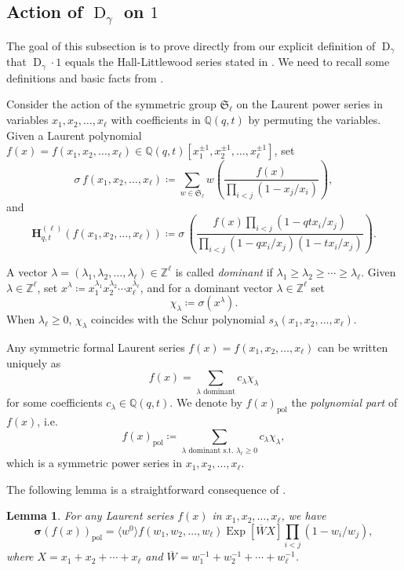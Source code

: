 \documentclass[reqno]{amsart}
\theoremstyle{plain}
\newtheorem{lemma}[theorem]{Lemma}
\theoremstyle{definition}
\theoremstyle{remark}
\DeclareMathOperator{\D}{D}
\DeclareMathOperator{\Exp}{Exp}
\newcommand{\<}{\langle}
\renewcommand{\>}{\rangle}
\begin{document}
\subsection{Action of \texorpdfstring{$\D_\gamma$}{Dgamma} on \texorpdfstring{$1$}{1}}
\label{section:Dgammaon1}

The goal of this subsection is to prove directly from our explicit definition of $\D_\gamma$ that $\D_\gamma \cdot 1$ equals the Hall-Littlewood series stated in \cite[Corollary~3.7.2]{BHMPS2023ShuffleAnyLine}. We need to recall some definitions and basic facts from \cite[Section~2]{BHMPS2023ShuffleAnyLine}.

Consider the action of the symmetric group $\mathfrak{S}_\ell$ on the Laurent power series in variables $x_1,x_2,\dots,x_\ell$ with coefficients in $\mathbb{Q}(q,t)$ by permuting the variables. Given a Laurent polynomial $f(x) = f(x_1,x_2,\dots,x_\ell) \in \mathbb{Q}(q,t)[x_1^{\pm 1}, x_2^{\pm 1}, \dots, x_\ell^{\pm 1}]$, set
\[
    \textbf{$\sigma$}\, f(x_1,x_2,\dots,x_\ell) \coloneqq \sum_{w\in \mathfrak{S}_\ell}w\left(\frac{f(x)}{\prod_{i<j}(1-x_j/x_i)}\right),
\]
and
\[
    \mathbf{H}_{q,t}^{(\ell)}(f(x_1,x_2,\dots,x_\ell)) \coloneqq \textbf{$\sigma$}\, \left( \frac{f(x) \prod_{i<j}(1-qtx_i/x_j) }{\prod_{i<j}(1-qx_i/x_j)(1-tx_i/x_j)}\right).
\]

A vector $\lambda=(\lambda_1,\lambda_2,\dots,\lambda_\ell) \in \mathbb{Z}^\ell$ is called \emph{dominant} if $\lambda_1\geq \lambda_2\geq\cdots \geq \lambda_\ell$. Given $\lambda\in \mathbb{Z}^\ell$, set $x^\lambda \coloneqq x_1^{\lambda_1}x_2^{\lambda_2}\cdots x_\ell^{\lambda_\ell}$, and for a dominant vector $\lambda\in \mathbb{Z}^\ell$ set
\[\chi_\lambda \coloneqq \textbf{$\sigma$}(x^\lambda).\]
When $\lambda_\ell\geq 0$, $\chi_\lambda$ coincides with the Schur polynomial $s_\lambda(x_1,x_2,\dots,x_\ell)$.

Any symmetric formal Laurent series $f(x) = f(x_1,x_2,\dots,x_\ell)$ can be written uniquely as 
\[ f(x) = \sum_{\lambda\text{ dominant}} c_\lambda \chi_\lambda \] 
for some coefficients $c_\lambda\in \mathbb{Q}(q,t)$. We denote by $f(x)_{\text{pol}}$ the \emph{polynomial part} of $f(x)$, i.e.\ 
\[ f(x)_{\text{pol}} \coloneqq \sum_{\lambda\text{ dominant s.t.\ }\lambda_\ell\geq 0} c_\lambda \chi_\lambda, \]
which is a symmetric power series in $x_1,x_2,\dots,x_\ell$.

The following lemma is a straightforward consequence of \cite[Lemma~2.3.1, Equation~(21)]{BHMPS2023ShuffleAnyLine}.
\begin{lemma}
    \label{lem:poly_part}
    For any Laurent series $f(x)$ in $x_1,x_2,\dots,x_\ell$, we have
    \[\boldsymbol{\sigma} (f(x))_{\text{pol}}=\langle w^0 \rangle f(w_1,w_2,\dots,w_\ell) \Exp[\overline{W}X]\prod_{i<j}(1-w_i/w_j),\]
    where $X=x_1+x_2+\cdots +x_\ell$ and $\overline{W}=w_1^{-1}+w_2^{-1}+\cdots +w_\ell^{-1}$.
\end{lemma}
\end{document}
